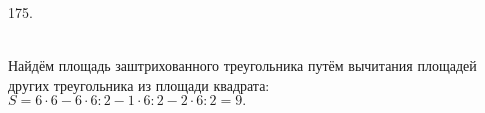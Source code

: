 175. \begin{figure}[ht!]
\end{figure}\\
Найдём площадь заштрихованного треугольника путём вычитания площадей других треугольника из площади квадрата: $S=6\cdot6-6\cdot6:2-1\cdot6:2-2\cdot6:2=9.$\\
